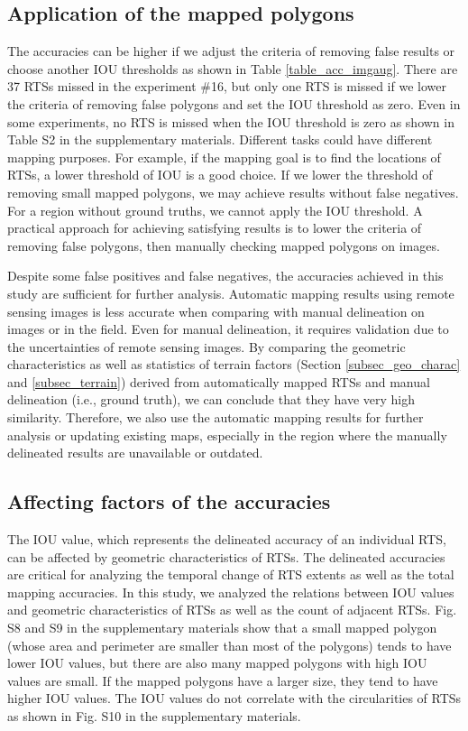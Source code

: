 \documentclass[preprint,12pt,authoryear]{elsarticle}
\begin{document}
\subsection{Application of the mapped polygons}
\label{subsec_potential_largeArea}

The accuracies can be higher if we adjust the criteria of removing false results or choose another IOU thresholds as shown in Table \ref{table_acc_imgaug}. There are 37 RTSs missed in the experiment \#16, but only one RTS is missed if we lower the criteria of removing false polygons and set the IOU threshold as zero. Even in some experiments, no RTS is missed when the IOU threshold is zero as shown in Table S2 in the supplementary materials. Different tasks could have different mapping purposes. For example, if the mapping goal is to find the locations of RTSs, a lower threshold of IOU is a good choice. If we lower the threshold of removing small mapped polygons, we may achieve results without false negatives. For a region without ground truths, we cannot apply the IOU threshold. A practical approach for achieving satisfying results is to lower the criteria of removing false polygons, then manually checking mapped polygons on images. 

Despite some false positives and false negatives, the accuracies achieved in this study are sufficient for further analysis. Automatic mapping results using remote sensing images is less accurate when comparing with manual delineation on images or in the field. Even for manual delineation, it requires validation due to the uncertainties of remote sensing images. By comparing the geometric characteristics as well as statistics of terrain factors (Section \ref{subsec_geo_charac} and \ref{subsec_terrain}) derived from automatically mapped RTSs and manual delineation (i.e., ground truth), we can conclude that they have very high similarity. Therefore, we also use the automatic mapping results for further analysis or updating existing maps, especially in the region where the manually delineated results are unavailable or outdated. 


\subsection{Affecting factors of the accuracies}
\label{subsec_acc_factors}

The IOU value, which represents the delineated accuracy of an individual RTS, can be affected by geometric characteristics of RTSs. The delineated accuracies are critical for analyzing the temporal change of RTS extents as well as the total mapping accuracies. In this study, we analyzed the relations between IOU values and geometric characteristics of RTSs as well as the count of adjacent RTSs. Fig. S8 and S9 in the supplementary materials show that a small mapped polygon (whose area and perimeter are smaller than most of the polygons) tends to have lower IOU values, but there are also many mapped polygons with high IOU values are small. If the mapped polygons have a larger size, they tend to have higher IOU values. The IOU values do not correlate with the circularities of RTSs as shown in Fig. S10 in the supplementary materials. 
\end{document}
